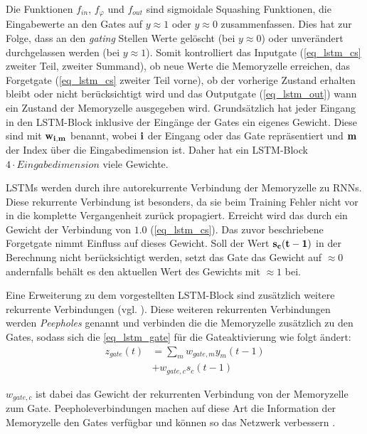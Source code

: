 Die Funktionen $f_{in}$, $f_{\varphi}$ und $f_{out}$ sind sigmoidale Squashing
Funktionen, die Eingabewerte an den Gates auf $y\approx1$ oder $y\approx0$
zusammenfassen. Dies hat zur Folge, dass an den \textit{gating} Stellen Werte
gelöscht (bei $y\approx0$) oder unverändert durchgelassen werden (bei
$y\approx1$). Somit kontrolliert das Inputgate (\autoref{eq_lstm_cs} zweiter
Teil, zweiter Summand), ob neue Werte die Memoryzelle erreichen, das Forgetgate
(\autoref{eq_lstm_cs} zweiter Teil vorne), ob der vorherige Zustand erhalten
bleibt oder nicht berücksichtigt wird und das Outputgate (\autoref{eq_lstm_out})
wann ein Zustand der Memoryzelle ausgegeben wird. Grundsätzlich hat jeder
Eingang in den \ac{LSTM}-Block inklusive der Eingänge der Gates ein eigenes
Gewicht. Diese sind mit $\bf w_{i,m}$ benannt, wobei $\bf i$ der Eingang oder das Gate
repräsentiert und $\bf m$ der Index über die Eingabedimension ist. Daher hat ein
\ac{LSTM}-Block $4\cdot Eingabedimension$ viele Gewichte. 

\acp{LSTM} werden durch ihre autorekurrente Verbindung der Memoryzelle zu
\acp{RNN}. Diese rekurrente Verbindung ist besonders, da sie beim Training
Fehler nicht vor in die komplette Vergangenheit zurück propagiert. Erreicht wird
das durch ein Gewicht der Verbindung von $1.0$ (\autoref{eq_lstm_cs}). Das zuvor
beschriebene Forgetgate nimmt Einfluss auf dieses Gewicht. Soll der Wert
$\bf s_c(t-1)$ in der Berechnung nicht berücksichtigt werden, setzt das Gate das
Gewicht auf $\approx0$ andernfalls behält es den aktuellen Wert des Gewichts mit
$\approx1$ bei. 

Eine Erweiterung zu dem vorgestellten \ac{LSTM}-Block sind zusätzlich weitere
rekurrente Verbindungen (vgl. \cite{Gers2002b}). Diese weiteren rekurrenten
Verbindungen werden \textit{Peepholes} genannt und verbinden die die Memoryzelle
zusätzlich zu den Gates, sodass sich die \autoref{eq_lstm_gate} für die Gateaktivierung
wie folgt ändert:
\begin{equation}
\label{eq_lstm_gate_peephole}
\begin{split}
z_{gate}(t) &= \sum \limits_{m} w_{gate,m}y_m(t-1) \\
			&+ w_{gate,c} s_c(t-1)
\end{split}
\end{equation}

$w_{gate,c}$ ist dabei das Gewicht der rekurrenten Verbindung von der
Memoryzelle zum Gate. Peepholeverbindungen machen auf diese Art die Information
der Memoryzelle den Gates verfügbar und können so das Netzwerk verbessern
\cite{Gers2002b}. 

